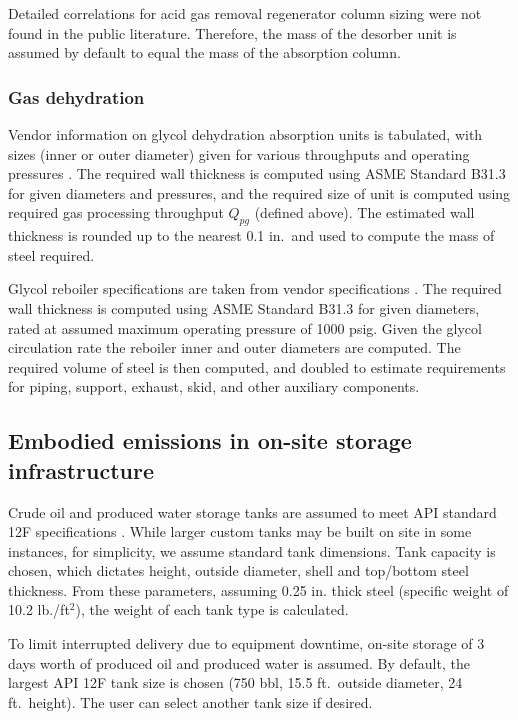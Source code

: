 \documentclass[11pt]{report}
\newcommand{\marg}[1]{{\footnotesize\textit{\textcolor{stanford}{'#1'}}}}
\newcommand{\marginnote}[1]{\marginpar{\marg{#1}}}
\begin{document}
{{{{Detailed correlations for acid gas removal regenerator column sizing were not found in the public literature. Therefore, the mass of the desorber unit is assumed by default to equal the mass of the absorption column.


\subsubsection{Gas dehydration}

Vendor information on \marginnote{Embodied Emissions 3.5.1} glycol dehydration absorption units is tabulated, with sizes (inner or outer diameter) given for various throughputs and operating pressures \cite{Exterran2012}. The required wall thickness is computed using ASME Standard B31.3 \cite[eq. 9.27]{Arnold2007} for given diameters and pressures, and the required \marginnote{Embodied Emissions 3.5.4-5} size of unit is computed using required gas processing throughput $Q_{pg}$ (defined above). The estimated wall thickness is rounded up to the nearest 0.1 in.\ and used to compute the mass of steel required. 

Glycol reboiler specifications are \marginnote{Embodied Emissions 3.5.10} taken from vendor specifications \cite{Exterran2012}. The required wall thickness is computed using ASME Standard B31.3 \cite[eq. 9.27]{Arnold2007} for given diameters, rated at assumed maximum operating pressure of 1000 psig. Given the glycol circulation rate \marginnote{Embodied Emissions 3.5.11-15} the reboiler inner and outer diameters are computed. The required volume of steel is then computed, and doubled to estimate requirements for piping, support, exhaust, skid, and other auxiliary components.

\subsection{Embodied emissions in on-site storage infrastructure}

Crude oil and produced water storage tanks are assumed to meet API standard 12F specifications \cite{API1994}. \marginnote{Embodied Emissions 4.1.1} While larger custom tanks may be built on site in some instances, for simplicity, we assume standard tank dimensions. Tank capacity is chosen, which dictates height, outside diameter, shell and top/bottom steel thickness. From these parameters, assuming 0.25 in. thick steel (specific weight of 10.2 lb./ft$^2$), the weight of each tank type is calculated.

To \marginnote{Embodied Emissions 4.1.2-3} limit interrupted delivery due to equipment downtime, on-site storage of 3 days worth of produced oil and produced water is assumed. By default, the largest API 12F tank size is chosen (750 bbl, 15.5 ft.\ outside diameter, 24 ft.\ height). The user can select another tank size if desired.

}}}}
\end{document}
